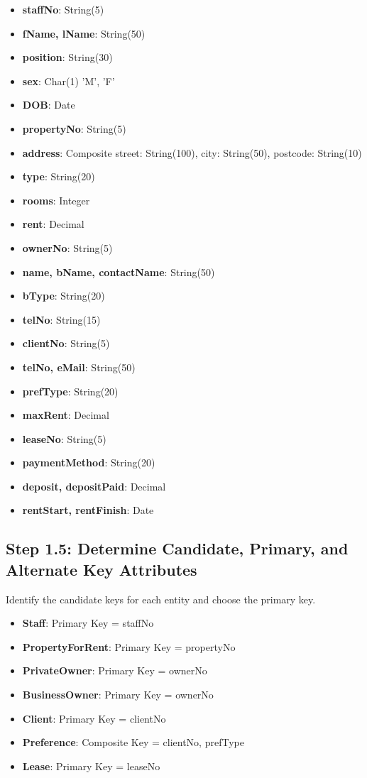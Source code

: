 \documentclass[a4paper,12pt]{article}
\begin{document}
\begin{itemize}
    \item \textbf{staffNo}: String(5)
    \item \textbf{fName, lName}: String(50)
    \item \textbf{position}: String(30)
    \item \textbf{sex}: Char(1) {'M', 'F'}
    \item \textbf{DOB}: Date
    \item \textbf{propertyNo}: String(5)
    \item \textbf{address}: Composite {street: String(100), city: String(50), postcode: String(10)}
    \item \textbf{type}: String(20)
    \item \textbf{rooms}: Integer
    \item \textbf{rent}: Decimal
    \item \textbf{ownerNo}: String(5)
    \item \textbf{name, bName, contactName}: String(50)
    \item \textbf{bType}: String(20)
    \item \textbf{telNo}: String(15)
    \item \textbf{clientNo}: String(5)
    \item \textbf{telNo, eMail}: String(50)
    \item \textbf{prefType}: String(20)
    \item \textbf{maxRent}: Decimal
    \item \textbf{leaseNo}: String(5)
    \item \textbf{paymentMethod}: String(20)
    \item \textbf{deposit, depositPaid}: Decimal
    \item \textbf{rentStart, rentFinish}: Date
\end{itemize}

\subsection*{Step 1.5: Determine Candidate, Primary, and Alternate Key Attributes}
Identify the candidate keys for each entity and choose the primary key.

\begin{itemize}
    \item \textbf{Staff}: Primary Key = staffNo
    \item \textbf{PropertyForRent}: Primary Key = propertyNo
    \item \textbf{PrivateOwner}: Primary Key = ownerNo
    \item \textbf{BusinessOwner}: Primary Key = ownerNo
    \item \textbf{Client}: Primary Key = clientNo
    \item \textbf{Preference}: Composite Key = {clientNo, prefType}
    \item \textbf{Lease}: Primary Key = leaseNo
\end{itemize}
\end{document}
